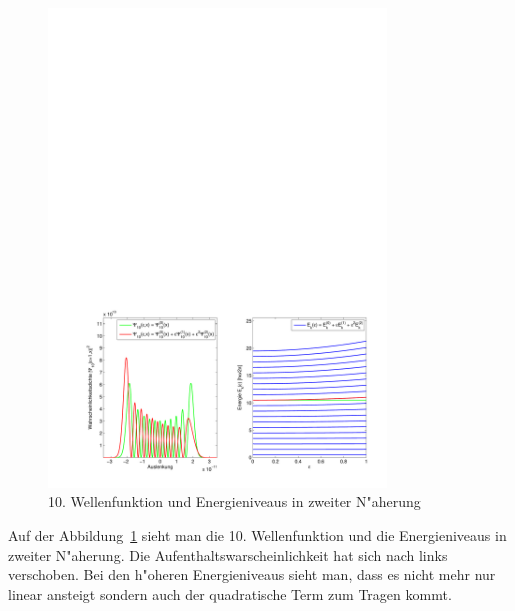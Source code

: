 \begin{refsection}
\begin{figure}	%
\centering
\includegraphics[width=0.8\textwidth]{anharmonisch/images/x3/Stoerung2Wellenfunktion.pdf}
\caption{10. Wellenfunktion und Energieniveaus in zweiter N"aherung
\label{skript:x3_Stoerung1Wellenfunktion}}
\end{figure}

Auf der Abbildung~\ref{skript:x3_Stoerung1Wellenfunktion} sieht man die 10. Wellenfunktion und die Energieniveaus in zweiter N"aherung. Die Aufenthaltswarscheinlichkeit hat sich nach links verschoben. Bei den h"oheren Energieniveaus sieht man, dass es nicht mehr nur linear ansteigt sondern auch der quadratische Term zum Tragen kommt.


\end{refsection}
